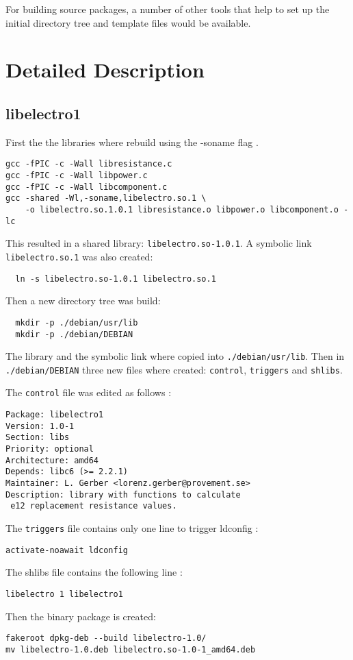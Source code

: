 \documentclass[a4paper,11pt,twoside]{article}
\begin{document}
For building source packages, a number of other tools that help to set up the
initial directory tree and template files would be available.

\section{Detailed Description}
\subsection{libelectro1}
First the the libraries where rebuild using the -soname flag \cite{tldpShlibs}.
\begin{verbatim}
gcc -fPIC -c -Wall libresistance.c
gcc -fPIC -c -Wall libpower.c
gcc -fPIC -c -Wall libcomponent.c
gcc -shared -Wl,-soname,libelectro.so.1 \
    -o libelectro.so.1.0.1 libresistance.o libpower.o libcomponent.o -lc
\end{verbatim}

This resulted in a shared library: \verb+libelectro.so-1.0.1+. A symbolic
link \verb+libelectro.so.1+ was also created:

\begin{verbatim}
  ln -s libelectro.so-1.0.1 libelectro.so.1
\end{verbatim}

Then a new directory tree was build:
\begin{verbatim}
  mkdir -p ./debian/usr/lib
  mkdir -p ./debian/DEBIAN
\end{verbatim}
The library and the symbolic link where copied into \verb+./debian/usr/lib+. Then
in \verb+./debian/DEBIAN+ three new files where created: \verb+control+,
\verb+triggers+ and \verb+shlibs+.

The \verb+control+ file was edited as follows \cite{controlfiles}:
\begin{verbatim}
Package: libelectro1
Version: 1.0-1
Section: libs
Priority: optional
Architecture: amd64
Depends: libc6 (>= 2.2.1)
Maintainer: L. Gerber <lorenz.gerber@provement.se>
Description: library with functions to calculate
 e12 replacement resistance values.
\end{verbatim}

The \verb+triggers+ file contains only one line to trigger
ldconfig \cite{debShlibs}:
\begin{verbatim}
activate-noawait ldconfig
\end{verbatim}

The shlibs file contains the following line \cite[8.6.4.2.]{debShlibs}:
\begin{verbatim}
libelectro 1 libelectro1
\end{verbatim}
Then the binary package is created:
\begin{verbatim}
fakeroot dpkg-deb --build libelectro-1.0/
mv libelectro-1.0.deb libelectro.so-1.0-1_amd64.deb
\end{verbatim}
\end{document}
